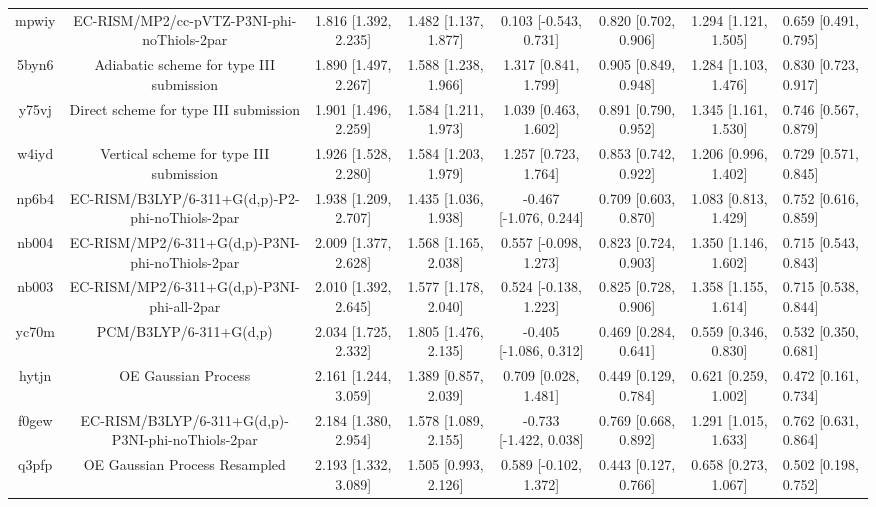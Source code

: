 \documentclass{article}
\begin{document}
\begin{center}
\begin{longtable}{|ccccccc|}
 mpwiy &         EC-RISM/MP2/cc-pVTZ-P3NI-phi-noThiols-2par &  1.816 [1.392, 2.235] &  1.482 [1.137, 1.877] &    0.103 [-0.543, 0.731] &  0.820 [0.702, 0.906] &   1.294 [1.121, 1.505] &   0.659 [0.491, 0.795] \\
 5byn6 &           Adiabatic scheme for type III submission &  1.890 [1.497, 2.267] &  1.588 [1.238, 1.966] &     1.317 [0.841, 1.799] &  0.905 [0.849, 0.948] &   1.284 [1.103, 1.476] &   0.830 [0.723, 0.917] \\
 y75vj &              Direct scheme for type III submission &  1.901 [1.496, 2.259] &  1.584 [1.211, 1.973] &     1.039 [0.463, 1.602] &  0.891 [0.790, 0.952] &   1.345 [1.161, 1.530] &   0.746 [0.567, 0.879] \\
 w4iyd &            Vertical scheme for type III submission &  1.926 [1.528, 2.280] &  1.584 [1.203, 1.979] &     1.257 [0.723, 1.764] &  0.853 [0.742, 0.922] &   1.206 [0.996, 1.402] &   0.729 [0.571, 0.845] \\
 np6b4 &    EC-RISM/B3LYP/6-311+G(d,p)-P2-phi-noThiols-2par &  1.938 [1.209, 2.707] &  1.435 [1.036, 1.938] &   -0.467 [-1.076, 0.244] &  0.709 [0.603, 0.870] &   1.083 [0.813, 1.429] &   0.752 [0.616, 0.859] \\
 nb004 &    EC-RISM/MP2/6-311+G(d,p)-P3NI-phi-noThiols-2par &  2.009 [1.377, 2.628] &  1.568 [1.165, 2.038] &    0.557 [-0.098, 1.273] &  0.823 [0.724, 0.903] &   1.350 [1.146, 1.602] &   0.715 [0.543, 0.843] \\
 nb003 &         EC-RISM/MP2/6-311+G(d,p)-P3NI-phi-all-2par &  2.010 [1.392, 2.645] &  1.577 [1.178, 2.040] &    0.524 [-0.138, 1.223] &  0.825 [0.728, 0.906] &   1.358 [1.155, 1.614] &   0.715 [0.538, 0.844] \\
 yc70m &                             PCM/B3LYP/6-311+G(d,p) &  2.034 [1.725, 2.332] &  1.805 [1.476, 2.135] &   -0.405 [-1.086, 0.312] &  0.469 [0.284, 0.641] &   0.559 [0.346, 0.830] &   0.532 [0.350, 0.681] \\
 hytjn &                                OE Gaussian Process &  2.161 [1.244, 3.059] &  1.389 [0.857, 2.039] &     0.709 [0.028, 1.481] &  0.449 [0.129, 0.784] &   0.621 [0.259, 1.002] &   0.472 [0.161, 0.734] \\
 f0gew &  EC-RISM/B3LYP/6-311+G(d,p)-P3NI-phi-noThiols-2par &  2.184 [1.380, 2.954] &  1.578 [1.089, 2.155] &   -0.733 [-1.422, 0.038] &  0.769 [0.668, 0.892] &   1.291 [1.015, 1.633] &   0.762 [0.631, 0.864] \\
 q3pfp &                      OE Gaussian Process Resampled &  2.193 [1.332, 3.089] &  1.505 [0.993, 2.126] &    0.589 [-0.102, 1.372] &  0.443 [0.127, 0.766] &   0.658 [0.273, 1.067] &   0.502 [0.198, 0.752] \\

\end{longtable}
\end{center}
\end{document}

